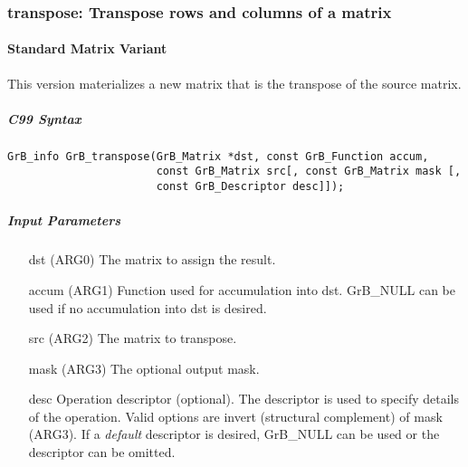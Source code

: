 
\subsubsection{{\sf transpose}: Transpose rows and columns of a matrix}


\paragraph{Standard Matrix Variant}

This version materializes a new matrix that is the transpose of the source matrix.

\subparagraph{C99 Syntax}

\begin{verbatim}
GrB_info GrB_transpose(GrB_Matrix *dst, const GrB_Function accum,
                       const GrB_Matrix src[, const GrB_Matrix mask [,
                       const GrB_Descriptor desc]]);
\end{verbatim}

\subparagraph{Input Parameters}

\begin{itemize}
	\item[{\sf dst}]   ({\sf ARG0}) The matrix to assign the result.
	\item[{\sf accum}] ({\sf ARG1}) Function used for accumulation into dst.  {\sf GrB\_NULL}
                       can be used if no accumulation into dst is desired.
	\item[{\sf src}]   ({\sf ARG2}) The matrix to transpose.
    \item[{\sf mask}]  ({\sf ARG3}) The optional output mask.

	\item[{\sf desc}]  Operation descriptor (optional). The descriptor
    is used to specify details of the operation. Valid options are 
    invert (structural complement) of mask ({\sf ARG3}). If
    a \emph{default} descriptor is desired,	{\sf GrB\_NULL} can be
    used or the descriptor can be omitted.
\end{itemize}

